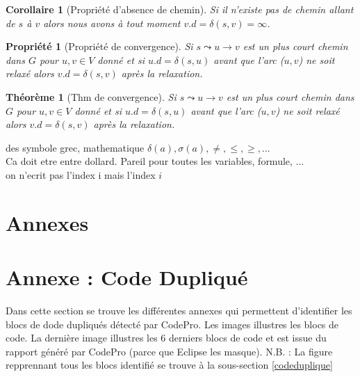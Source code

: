 \documentclass[12pt,a4paper,final]{article}
\newtheorem{prop}{Propriété}
\newtheorem{corollaire}{Corollaire}
\newtheorem{thm}{Théorème}
\begin{document}
\begin{corollaire}[Propriété d'absence de chemin]\label{no_path_prop}
Si il n'existe pas de chemin allant de $s$ à $v$ alors nous avons à tout moment $v.d = \delta(s,v) = \infty$.
\end{corollaire}

\begin{prop}[Propriété de convergence]\label{convergence_prop}
Si $s \leadsto u \rightarrow v$ est un plus court chemin dans $G$ pour $u, v \in V$ donné et si $u.d = \delta(s,u)$ avant que l'arc ($u,v$) ne soit relaxé alors $v.d = \delta(s,v)$ après la relaxation.
\end{prop}

\begin{thm}[Thm de convergence]\label{convergence_thm}
Si $s \leadsto u \rightarrow v$ est un plus court chemin dans $G$ pour $u, v \in V$ donné et si $u.d = \delta(s,u)$ avant que l'arc ($u,v$) ne soit relaxé alors $v.d = \delta(s,v)$ après la relaxation.
\end{thm}

des symbole grec, mathematique $\delta(a), \sigma(a), \neq, \leq, \geq, ...$\\
Ca doit etre entre dollard. Pareil pour toutes les variables, formule, ...\\
on n'ecrit pas l'index i mais l'index $i$





\clearpage
\newpage
\section{Annexes} \label{sec:annexe}
\appendix %
\section{Annexe : Code Dupliqué}\label{SimilarCode}
Dans cette section se trouve les différentes annexes qui permettent d'identifier les blocs de dode dupliqués détecté par CodePro. Les images illustres les blocs de code. La dernière image illustres les 6 derniers blocs de code et est issue du rapport généré par CodePro (parce que Eclipse les masque).
N.B. : La figure repprennant tous les blocs identifié se trouve à la sous-section \ref{codeduplique}
\end{document}
